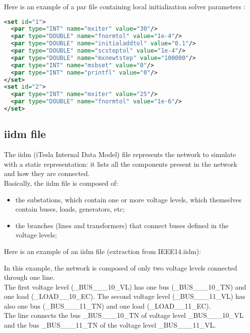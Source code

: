 \documentclass[a4paper, 12pt]{report}
\begin{document}
Here is an example of a par file containing local initialization solver parameters :

\begin{lstlisting}[language=XML]
<set id="1">
  <par type="INT" name="mxiter" value="30"/>
  <par type="DOUBLE" name="fnormtol" value="1e-4"/>
  <par type="DOUBLE" name="initialaddtol" value="0.1"/>
  <par type="DOUBLE" name="scsteptol" value="1e-4"/>
  <par type="DOUBLE" name="mxnewtstep" value="100000"/>
  <par type="INT" name="msbset" value="0"/>
  <par type="INT" name="printfl" value="0"/>
</set>
<set id="2">
  <par type="INT" name="mxiter" value="25"/>
  <par type="DOUBLE" name="fnormtol" value="1e-6"/>
</set>
\end{lstlisting}

\subsection{iidm file}
\label{DynawoInputFiles_inputs_iidm}

The iidm (iTesla Internal Data Model) file represents the network to simulate with a static representation: it lists all the components present in the network and how they are connected. \\

Basically, the iidm file is composed of:
\begin{itemize}
\item the substations, which contain one or more voltage levels, which themselves contain buses, loads, generators, etc;
\item the branches (lines and transformers) that connect buses defined in the voltage levels;
\end{itemize}

Here is an example of an iidm file (extraction from IEEE14.iidm):


In this example, the network is composed of only two voltage levels connected through one line. \\

The first voltage level (\_BUS\_\_\_10\_VL) has one bus (\_BUS\_\_\_10\_TN) and one load (\_LOAD\_\_10\_EC). The second voltage level (\_BUS\_\_\_11\_VL) has also one bus (\_BUS\_\_\_11\_TN) and one load (\_LOAD\_\_11\_EC). \\

The line connects the bus \_BUS\_\_\_10\_TN of voltage level \_BUS\_\_\_10\_VL and the bus \_BUS\_\_\_11\_TN of the voltage level \_BUS\_\_\_11\_VL. \\
\end{document}
